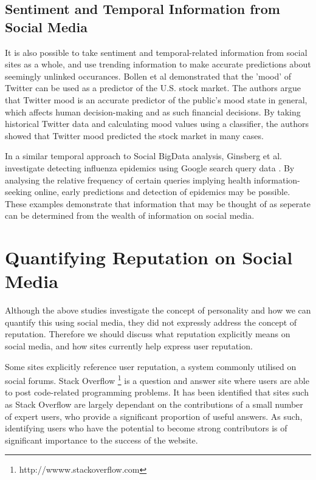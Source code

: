 \subsection{Sentiment and Temporal Information from Social Media}

It is also possible to take sentiment and temporal-related information from social sites as a whole, and use trending information to make accurate predictions about seemingly unlinked occurances. Bollen et al \cite{bollen2011twitter} demonstrated that the 'mood' of Twitter can be used as a predictor of the U.S. stock market. The authors argue that Twitter mood is an accurate predictor of the public's mood state in general, which affects human decision-making and as such financial decisions. By taking historical Twitter data and calculating mood values using a classifier, the authors showed that Twitter mood predicted the stock market in many cases. 

In a similar temporal approach to Social BigData analysis, Ginsberg et al. investigate detecting influenza epidemics using Google search query data \cite{ginsberg2008detecting}. By analysing the relative frequency of certain queries implying health information-seeking online, early predictions and detection of epidemics may be possible. These examples demonstrate that information that may be thought of as seperate can be determined from the wealth of information on social media.


\section{Quantifying Reputation on Social Media}

Although the above studies investigate the concept of personality and how we can quantify this using social media, they did not expressly address the concept of reputation. Therefore we should discuss what reputation explicitly means on social media, and how sites currently help express user reputation. 

Some sites explicitly reference user reputation, a system commonly utilised on social forums. Stack Overflow \footnote{http://wwww.stackoverflow.com} is a question and answer site where users are able to post code-related programming problems. It has been identified that sites such as Stack Overflow are largely dependant on the contributions of a small number of expert users, who provide a significant proportion of useful answers. As such, identifying users who have the potential to become strong contributors is of significant importance to the success of the website.

